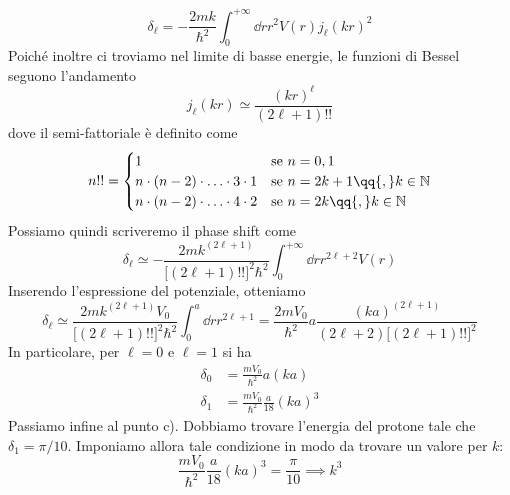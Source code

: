 \begin{soluzione}
\begin{equation*}
      \delta_{\ell}
      =-\frac{2mk}{\hbar^2} \int_{0}^{+\infty} \dd{r} r^2 V(r) j_{\ell}(kr)^2
   \end{equation*}
   Poiché inoltre ci troviamo nel limite di basse energie, le funzioni di Bessel seguono l'andamento
   \begin{equation*}
      j_{\ell}(kr)
      \simeq \frac{(kr)^{\ell}}{(2\ell+1)!!}
   \end{equation*}
   dove il semi-fattoriale è definito come
   \begin{equation*}
      n!!=
      \begin{cases}
         1 & \text{se } n=0,1\\
         n \cdot (n - 2) \cdot \ldots \cdot 3 \cdot 1 & \text{se } n=2k + 1 \qq{,} k \in \mathbb{N}\\
         n \cdot (n - 2) \cdot \ldots \cdot 4 \cdot 2 & \text{se } n=2k \qq{,} k \in \mathbb{N}\\
      \end{cases}
   \end{equation*}
   Possiamo quindi scriveremo il phase shift come
   \begin{equation*}
      \delta_{\ell}
      \simeq - \frac{2 m k^{(2\ell+1)}}{\bigl[ (2\ell+1)!! \bigr]^2 \hbar^2} \int_{0}^{+\infty} \dd{r} r^{2 \ell + 2} V(r)
   \end{equation*}
   Inserendo l'espressione del potenziale, otteniamo
   \begin{equation*}
      \delta_{\ell}
      \simeq \frac{2 m k^{(2\ell+1)} V_0}{\bigl[ (2\ell+1)!! \bigr]^2 \hbar^2} \int_{0}^{a} \dd{r} r^{2 \ell + 1}
      =\frac{2 m V_0}{\hbar^2} a \frac{(ka)^{(2\ell+1)}}{(2 \ell + 2) \bigl[ (2\ell+1)!! \bigr]^2}
   \end{equation*}
   In particolare, per $\ell=0$ e $\ell=1$ si ha
   \begin{equation*}
      \begin{split}
         \delta_0
         & =\frac{m V_0}{\hbar^2} a (ka)
         \\
         \delta_1
         &=\frac{m V_0}{\hbar^2} \frac{a}{18} (ka)^3
      \end{split}
   \end{equation*}
   Passiamo infine al punto c). Dobbiamo trovare l'energia del protone tale che $\delta_1=\pi/10$. Imponiamo allora tale condizione in modo da trovare un valore per $k$:
   \begin{equation*}
      \frac{m V_0}{\hbar^2} \frac{a}{18} (ka)^3
      =\frac{\pi}{10}
      \implies
      k^3

\end{equation*}
\end{soluzione}
